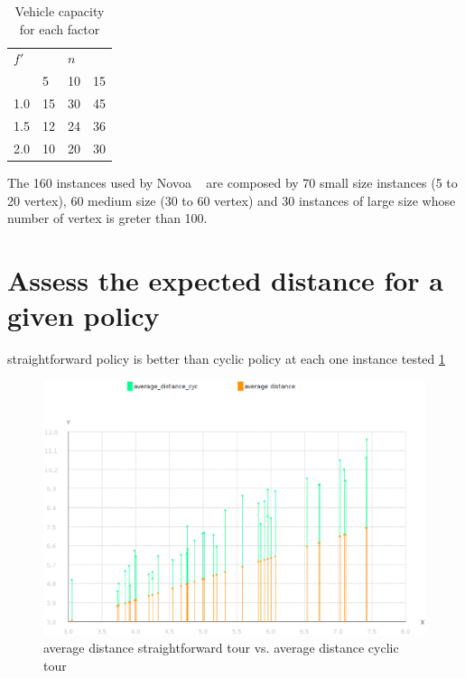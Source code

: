 \begin{table}
  \centering
  \caption{Vehicle capacity for each factor}\label{tb:Q}
\begin{tabular}{l l l l}
  \hline
  $f'$ &   & $n$ &   \\
  \cline{2-4}
      & 5 & 10 & 15 \\
  \hline
  1.0 & 15 & 30 & 45 \\
  1.5 & 12 & 24 & 36 \\
  2.0 & 10 & 20 & 30 \\
  \hline
\end{tabular}
\end{table}

The 160 instances used by Novoa ~\cite{novoa_approximate_2009} are composed by 70 small size instances (5 to 20 vertex), 60 medium size (30 to 60 vertex) and 30 instances of large size whose number of vertex is greter than 100.

\section{Assess the expected distance for a given policy}

straightforward policy is better than cyclic policy at each one instance tested \ref{fig:avg_distance_cyclic_vs_avg_distance_forward}

\begin{figure}[!htbp]
  \begin{center}
   \includegraphics[width=1\textwidth]{Images/Chapter5/cyclic_vs_straightforward_avgdistance_n5_n8.eps}
  \end{center}
    \caption{average distance straightforward tour vs. average distance cyclic tour}\label{fig:avg_distance_cyclic_vs_avg_distance_forward}
\end{figure}

